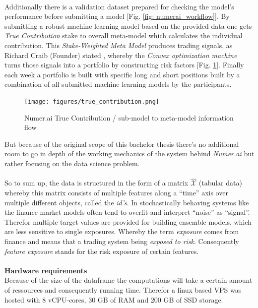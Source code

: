 \documentclass[12pt, a4paper]{article}
\begin{document}
\\
Additionally there is a validation dataset prepared for checking the model's performance before submitting a model [Fig. \ref{fig: numerai_workflow}]. By submitting a robust machine learning model based on the provided data one gets \textit{True Contribution} stake to overall meta-model which calculates the individual contribution. This \textit{Stake-Weighted Meta Model} produces trading signals, as Richard Craib (Founder) stated \cite{Craib2023}, whereby the \textit{Convex optimization machine} turns those signals into a portfolio by constructing risk factors [Fig. \ref{fig: numerai_true_contribution}]. Finally each week a portfolio is built with specific long and short positions built by a combination of all submitted machine learning models by the participants. \\
\begin{figure}[!htpb]
    \centering
    \texttt{[image: figures/true\_contribution.png]}
    \caption[Numer.ai True Contribution schematic]{Numer.ai True Contribution / sub-model to meta-model information flow \cite{Numerai, Craib2023}}
    \label{fig: numerai_true_contribution}
\end{figure}
\newpage
But because of the original scope of this bachelor thesis there's no additional room to go in depth of the working mechanics of the system behind \textit{Numer.ai} \cite{Numerai} but rather focusing on the data science problem. \\
\\
So to sum up, the data is structured in the form of a matrix $\hat{\mathcal{X}}$ (tabular data) whereby this matrix consists of multiple features along a ``time'' axis over multiple different objects, called the \textit{id's}. In stochastically behaving systems like the finance market models often tend to overfit and interpret ``noise'' as ``signal''. Therefor multiple target values are provided for building ensemble models, which are less sensitive to single exposures. Whereby the term \textit{exposure} comes from finance and means that a trading system being \textit{exposed to risk}. Consequently \textit{feature exposure} stands for the risk exposure of certain features. \\
\\
\textbf{Hardware requirements} \\
Because of the size of the dataframe the computations will take a certain amount of ressources and consequently running time. Therefor a linux based VPS was hosted with 8 vCPU-cores, 30 GB of RAM and 200 GB of SSD storage.
\newpage
\end{document}
